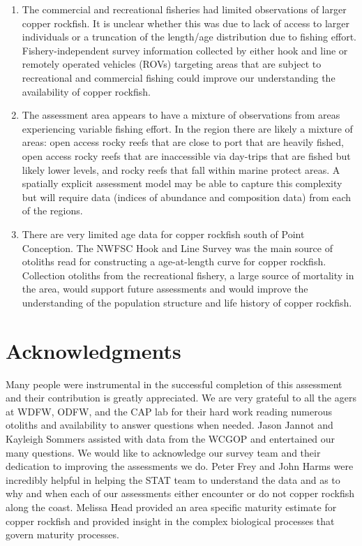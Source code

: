 \documentclass[11pt,
  english,
  a4paper,
]{article}
\begin{document}
\begin{enumerate}

    \item The commercial and recreational fisheries had limited observations of larger copper rockfish.  It is unclear whether this was due to lack of access to larger individuals or a truncation of the length/age distribution due to fishing effort. Fishery-independent survey information collected by either hook and line or remotely operated vehicles (ROVs) targeting areas that are subject to recreational and commercial fishing could improve our understanding the availability of copper rockfish.

    \item The assessment area appears to have a mixture of observations from areas experiencing variable fishing effort. In the region there are likely a mixture of areas: open access rocky reefs that are close to port that are heavily fished, open access rocky reefs that are inaccessible via day-trips that are fished but likely lower levels, and rocky reefs that fall within marine protect areas.  A spatially explicit assessment model may be able to capture this complexity but will require data (indices of abundance and composition data) from each of the regions. 

    \item There are very limited age data for copper rockfish south of Point Conception. The NWFSC Hook and Line Survey was the main source of otoliths read for constructing a age-at-length curve for copper rockfish. Collection otoliths from the recreational fishery, a large source of mortality in the area, would support future assessments  and would improve the understanding of the population structure and life history of copper rockfish. 

\end{enumerate}


\hypertarget{acknowledgments}{%
\section{Acknowledgments}\label{acknowledgments}}

\leavevmode\tagmcend\tagstructend


Many people were instrumental in the successful completion of this assessment and their contribution is greatly appreciated. We are very grateful to all the agers at WDFW, ODFW, and the CAP lab for their hard work reading numerous otoliths and availability to answer questions when needed. Jason Jannot and Kayleigh Sommers assisted with data from the WCGOP and entertained our many questions. We would like to acknowledge our survey team and their dedication to improving the assessments we do. Peter Frey and John Harms were incredibly helpful in helping the STAT team to understand the data and as to why and when each of our assessments either encounter or do not copper rockfish along the coast. Melissa Head provided an area specific maturity estimate for copper rockfish and provided insight in the complex biological processes that govern maturity processes.
\end{document}
